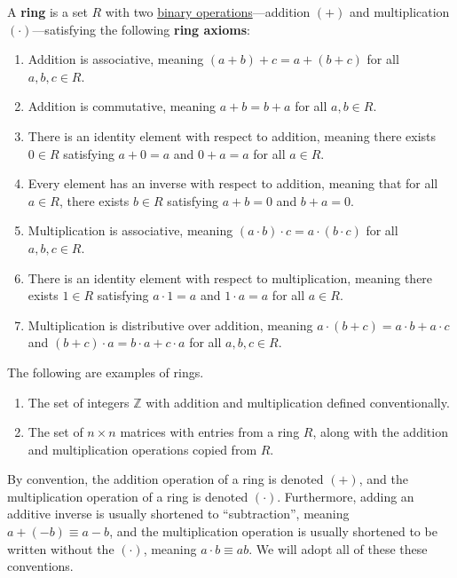 \documentclass{scrartcl}
\begin{document}
\begin{definition}[Ring]
    \label{def:ring}

    \newcommand{\Z}{\mathbb{Z}}

    A \textbf{ring} is a set $R$ with two \hyperref[def:binary operation]{binary operations}---addition $(+)$ and
    multiplication $(\cdot)$---satisfying the following \textbf{ring axioms}:
    \begin{enumerate}
        \item Addition is associative, meaning $(a+b)+c=a+(b+c)$ for all $a,b,c\in R$.
        \item Addition is commutative, meaning $a+b=b+a$ for all $a,b\in R$.

        \item
            There is an identity element with respect to addition, meaning there exists $0\in R$ satisfying $a+0=a$ and
            $0+a=a$ for all $a\in R$.

        \item
            Every element has an inverse with respect to addition, meaning that for all $a\in R$, there exists $b\in R$
            satisfying $a+b=0$ and $b+a=0$.

        \item Multiplication is associative, meaning $(a\cdot b)\cdot c=a\cdot (b\cdot c)$ for all $a,b,c\in R$.

        \item
            There is an identity element with respect to multiplication, meaning there exists $1\in R$ satisfying
            $a\cdot 1=a$ and $1\cdot a=a$ for all $a\in R$.

        \item
            Multiplication is distributive over addition, meaning $a\cdot (b+c)=a\cdot b+a\cdot c$ and
            $(b+c)\cdot a=b\cdot a+c\cdot a$ for all $a,b,c\in R$.
    \end{enumerate}

    The following are examples of rings.
    \begin{enumerate}
        \item The set of integers $\Z$ with addition and multiplication defined conventionally.
        \item
            The set of $n\times n$ matrices with entries from a ring $R$, along with the addition and multiplication
            operations copied from $R$.
    \end{enumerate}

    By convention, the addition operation of a ring is denoted $(+)$, and the multiplication operation of a ring is
    denoted $(\cdot)$.
    Furthermore, adding an additive inverse is usually shortened to ``subtraction'', meaning $a+(-b)\equiv a-b$, and
    the multiplication operation is usually shortened to be written without the $(\cdot)$, meaning $a\cdot b\equiv ab$.
    We will adopt all of these these conventions.


\end{definition}
\end{document}
